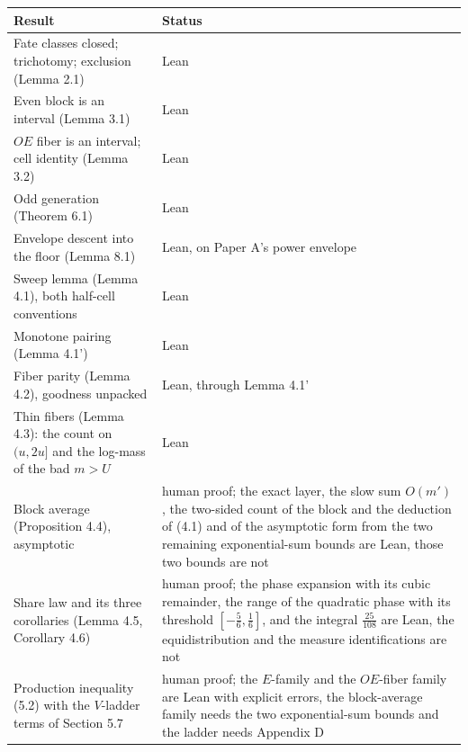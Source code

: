 \documentclass[11pt,a4paper]{article}
\begin{document}
\begingroup\small

\begin{longtable}[]{@{}
  >{\raggedright\arraybackslash}p{}
  >{\raggedright\arraybackslash}p{}@{}}
\toprule\noalign{}
\begin{minipage}[b]{\linewidth}\raggedright
Result
\end{minipage} & \begin{minipage}[b]{\linewidth}\raggedright
Status
\end{minipage} \\
\midrule\noalign{}
\endhead
\bottomrule\noalign{}
\endfoot
\bottomrule\noalign{}
\endlastfoot
Fate classes closed; trichotomy; exclusion (Lemma 2.1) & Lean \\
Even block is an interval (Lemma 3.1) & Lean \\
\(OE\) fiber is an interval; cell identity (Lemma 3.2) & Lean \\
Odd generation (Theorem 6.1) & Lean \\
Envelope descent into the floor (Lemma 8.1) & Lean, on Paper A's power
envelope \\
Sweep lemma (Lemma 4.1), both half-cell conventions & Lean \\
Monotone pairing (Lemma 4.1') & Lean \\
Fiber parity (Lemma 4.2), goodness unpacked & Lean, through Lemma
4.1' \\
Thin fibers (Lemma 4.3): the count on \((u,2u]\) and the log-mass of the
bad \(m>U\) & Lean \\
Block average (Proposition 4.4), asymptotic & human proof; the exact
layer, the slow sum \(O(m')\), the two-sided count of the block and the
deduction of (4.1) and of the asymptotic form from the two remaining
exponential-sum bounds are Lean, those two bounds are not \\
Share law and its three corollaries (Lemma 4.5, Corollary 4.6) & human
proof; the phase expansion with its cubic remainder, the range of the
quadratic phase with its threshold \([-\tfrac56,\tfrac16]\), and the
integral \(\tfrac{25}{108}\) are Lean, the equidistribution and the
measure identifications are not \\
Production inequality (5.2) with the \(V\)-ladder terms of Section 5.7 &
human proof; the \(E\)-family and the \(OE\)-fiber family are Lean with
explicit errors, the block-average family needs the two exponential-sum
bounds and the ladder needs Appendix D \\

\end{longtable}
\end{document}
